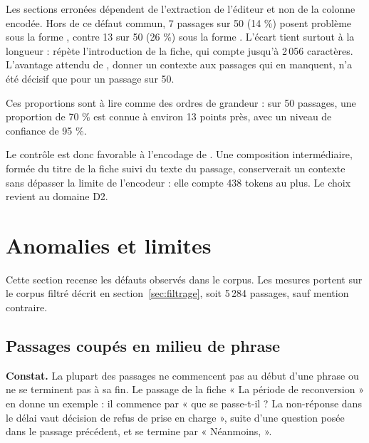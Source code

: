 Les sections erronées dépendent de l'extraction de l'éditeur et non de la colonne encodée. Hors de ce
défaut commun, 7 passages sur 50 (14 \%) posent problème sous la forme , contre 13 sur 50
(26 \%) sous la forme . L'écart tient surtout à la longueur : 
répète l'introduction de la fiche, qui compte jusqu'à 2\,056 caractères. L'avantage attendu de
, donner un contexte aux passages qui en manquent, n'a été décisif que pour un passage
sur 50.

Ces proportions sont à lire comme des ordres de grandeur : sur 50 passages, une proportion de 70 \%
est connue à environ 13 points près, avec un niveau de confiance de 95 \%.

Le contrôle est donc favorable à l'encodage de . Une composition intermédiaire, formée du
titre de la fiche suivi du texte du passage, conserverait un contexte sans dépasser la limite de
l'encodeur : elle compte 438 tokens au plus. Le choix revient au domaine D2.

\section{Anomalies et limites}\label{sec:anomalies}

Cette section recense les défauts observés dans le corpus. Les mesures portent sur le corpus filtré
décrit en section~\ref{sec:filtrage}, soit 5\,284 passages, sauf mention contraire.

\subsection{Passages coupés en milieu de phrase}\label{sec:coupures}

\textbf{Constat.} La plupart des passages ne commencent pas au début d'une phrase ou ne se terminent pas
à sa fin. Le passage  de la fiche « La période de reconversion » en donne un exemple :
il commence par « que se passe-t-il ? La non-réponse dans le délai vaut décision de refus de prise en
charge », suite d'une question posée dans le passage précédent, et se termine par « Néanmoins, ».

